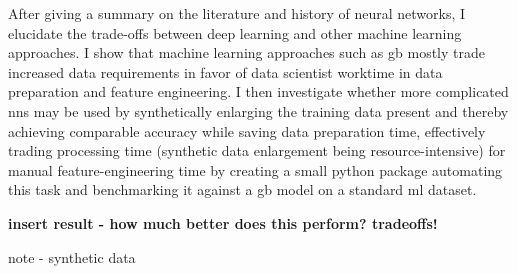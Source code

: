 
After giving a summary on the literature and history of neural networks, I elucidate the trade-offs between deep learning and other machine learning approaches. I show that machine learning approaches such as \ac{gb} mostly trade increased data requirements in favor of data scientist worktime in data preparation and feature engineering.
I then investigate whether more complicated \acp{nn} may be used by synthetically enlarging the training data present and thereby achieving comparable accuracy while saving data preparation time, effectively trading processing time (synthetic data enlargement being resource-intensive) for manual feature-engineering time by creating a small python package automating this task and benchmarking it against a \ac{gb} model on a standard \ac{ml} dataset.

\textbf{insert result - how much better does this perform? tradeoffs!}

note - synthetic data \cite{10.1145/3339252.3339281}

